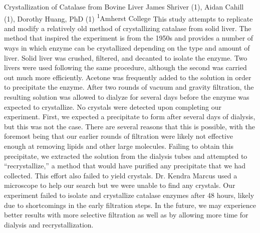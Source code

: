 \makeabstract
{
Crystallization of Catalase from Bovine Liver
}
{
James Shriver (1), Aidan Cahill (1), Dorothy Huang, PhD (1)
}
{
\textsuperscript{1}Amherst College
}
{
This study attempts to replicate and modify a relatively old method of crystallizing catalase from solid liver. The method that inspired the experiment is from the 1950s and provides a number of ways in which enzyme can be crystallized depending on the type and amount of liver.
}
{
Solid liver was crushed, filtered, and decanted to isolate the enzyme. Two livers were used following the same procedure, although the second was carried out much more efficiently. Acetone was frequently added to the solution in order to precipitate the enzyme. After two rounds of vacuum and gravity filtration, the resulting solution was allowed to dialyze for several days before the enzyme was expected to crystallize. 
}
{
No crystals were detected upon completing our experiment. First, we expected a precipitate to form after several days of dialysis, but this was not the case. There are several reasons that this is possible, with the foremost being that our earlier rounds of filtration were likely not effective enough at removing lipids and other large molecules. Failing to obtain this precipitate, we extracted the solution from the dialysis tubes and attempted to “recrystallize,” a method that would have purified any precipitate that we had collected. This effort also failed to yield crystals. Dr. Kendra Marcus used a microscope to help our search but we were unable to find any crystals. 
}
{
Our experiment failed to isolate and crystallize catalase enzymes after 48 hours, likely due to shortcomings in the early filtration steps. In the future, we may experience better results with more selective filtration as well as by allowing more time for dialysis and recrystallization. 
}

\newpage
